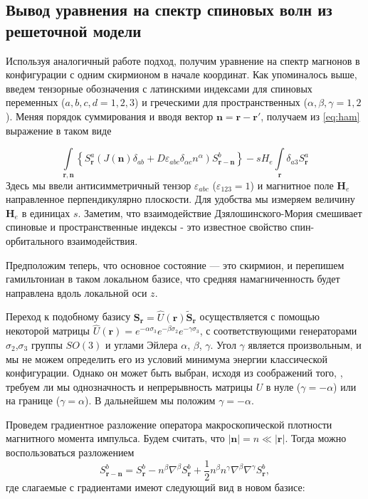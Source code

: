 \documentclass[a4paper,article,14pt]{extarticle}
\begin{document}
\subsection{Вывод уравнения на спектр спиновых волн из решеточной модели}
Используя аналогичный работе \cite{aristov1} подход, получим уравнение на спектр магнонов в конфигурации с одним скирмионом в начале координат. Как упоминалось выше, введем тензорные обозначения с латинскими индексами для спиновых переменных ($a,b,c,d = 1,2,3$) и греческими для пространственных ($\alpha, \beta, \gamma = 1,2$).  Меняя порядок суммирования и вводя вектор $\mathbf{n}=\mathbf{r} - \mathbf{r}'$, получаем из \eqref{eq:ham} выражение в таком виде

\begin{equation}
\label{eq:mainHam}
\int\limits_{{\mathbf{r}},{\mathbf{n}}} {\left\{ { S_{\mathbf{r}}^a\left( {J\left( {\mathbf{n}} \right){\delta _{ab}} + D{\varepsilon _{abc}}{\delta _{\alpha c}}{n^\alpha }} \right) S_{{\mathbf{r}} - {\mathbf{n}}}^b} \right\}}  - s H_e \int\limits_{\mathbf{r}} { \delta _{a3}  S_{\mathbf{r}}^a }
\end{equation}
Здесь мы ввели антисимметричный тензор $\varepsilon_{abc}$ ($\varepsilon_{123} = 1$) и магнитное поле $\mathbf{H}_e$ направленное перпендикулярно плоскости. Для удобства мы измеряем величину $\mathbf{H}_e$ в единицах $s$. Заметим, что взаимодействие Дзялошинского-Мория смешивает спиновые и пространственные индексы - это известное свойство спин-орбитального взаимодействия.

Предположим теперь, что основное состояние --- это скирмион, и перепишем гамильтониан в таком локальном базисе, что средняя намагниченность будет направлена вдоль локальной оси $z$.

Переход к подобному базису ${\mathbf{S}}_{\mathbf{r}} = \hat U\left( \mathbf{r} \right)\tilde { \mathbf{S}}_{\mathbf{r}}$ осуществляется с помощью некоторой матрицы $\hat U(\mathbf{r}) = e^{-\alpha \sigma_3}e^{-\beta \sigma_2}e^{-\gamma \sigma_3}$, с соответствующими генераторами $\sigma_2$,$\sigma_3$ группы $SO(3)$ и углами Эйлера $\alpha$, $\beta$, $\gamma$. Угол $\gamma$ является произвольным, и мы не можем определить его из условий минимума энергии классической конфигурации. Однако он может быть выбран, исходя из соображений того, \cite{aristov1}, требуем ли мы однозначность и непрерывность матрицы $U$ в нуле ($\gamma = -\alpha$) или на границе ($\gamma = \alpha$). В дальнейшем мы положим  $\gamma = -\alpha$.

Проведем градиентное разложение оператора макроскопической плотности магнитного момента импульса. Будем считать, что $|\mathbf{n}|=n \ll |\mathbf{r}|$. Тогда можно воспользоваться разложением $${S}_{{\mathbf{r}} - {\mathbf{n}}}^b = {S}_{\mathbf{r}}^b - {n^\beta }{\nabla ^\beta }{S}_{\mathbf{r}}^b + \frac{1}{2}{n^\beta }{n^\gamma }{\nabla ^\beta }{\nabla ^\gamma }{S}_{\mathbf{r}}^b,$$ где слагаемые с градиентами имеют следующий вид в новом базисе:
\end{document}
